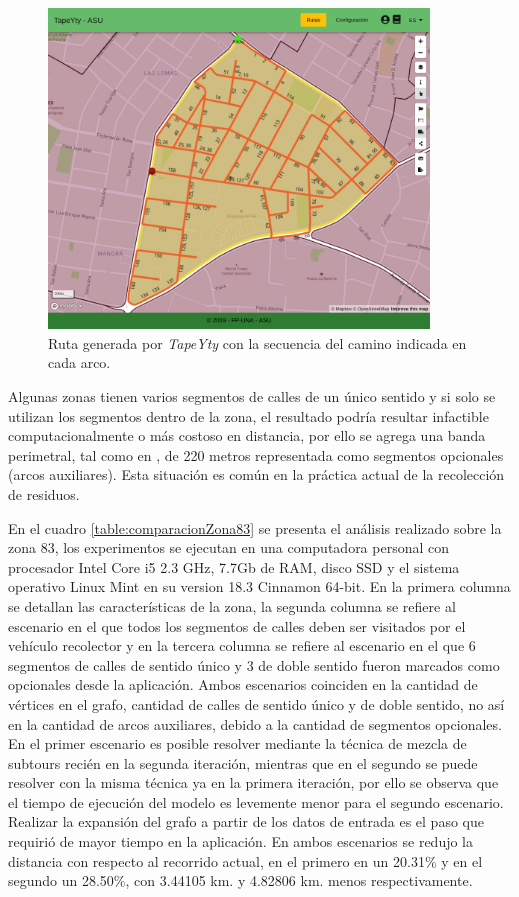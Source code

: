 \documentclass[conference,compsoc]{IEEEtran}
\begin{document}
\begin{figure}[tbp]
\centerline{\includegraphics[width=0.9\textwidth]{imagenes/recorrido83ConOpcionales.png}}
\caption{Ruta generada por \textit{TapeYty} con la secuencia del camino indicada en cada arco.}
\label{fig:RecorridoTapeYtyZona83Opcionales}
\end{figure}

Algunas zonas tienen varios segmentos de calles de un único sentido y si solo se utilizan los segmentos dentro de la zona, el resultado podría resultar infactible computacionalmente o más costoso en distancia, por ello se agrega una banda perimetral, tal como en \cite{Braier2017AnArgentina}, de 220 metros representada como segmentos opcionales (arcos auxiliares). Esta situación es común en la práctica actual de la recolección de residuos.

En el cuadro \ref{table:comparacionZona83} se presenta el análisis realizado sobre la zona 83, los experimentos se ejecutan en una computadora personal con procesador Intel\textcopyright{}  Core\texttrademark{} i5 2.3 GHz, 7.7Gb de RAM, disco SSD y el sistema operativo Linux Mint en su version 18.3 Cinnamon 64-bit. En la primera columna se detallan las características de la zona, la segunda columna se refiere al escenario en el que todos los segmentos de calles deben ser visitados por el vehículo recolector y en la tercera columna se refiere al escenario en el que 6 segmentos de calles de sentido único y 3 de doble sentido fueron marcados como opcionales desde la aplicación. Ambos escenarios coinciden en la cantidad de vértices en el grafo, cantidad de calles de sentido único y de doble sentido, no así en la cantidad de arcos auxiliares, debido a la cantidad de segmentos opcionales. En el primer escenario es posible resolver mediante la técnica de mezcla de subtours recién en la segunda iteración, mientras que en el segundo se puede resolver con la misma técnica ya en la primera iteración, por ello se observa que el tiempo de ejecución del modelo es levemente menor para el segundo escenario. Realizar la expansión del grafo a partir de los datos de entrada es el paso que requirió de mayor tiempo en la aplicación. En ambos escenarios se redujo la distancia con respecto al recorrido actual, en el primero en un 20.31\% y en el segundo un 28.50\%, con 3.44105 km. y 4.82806 km. menos respectivamente.
\end{document}
